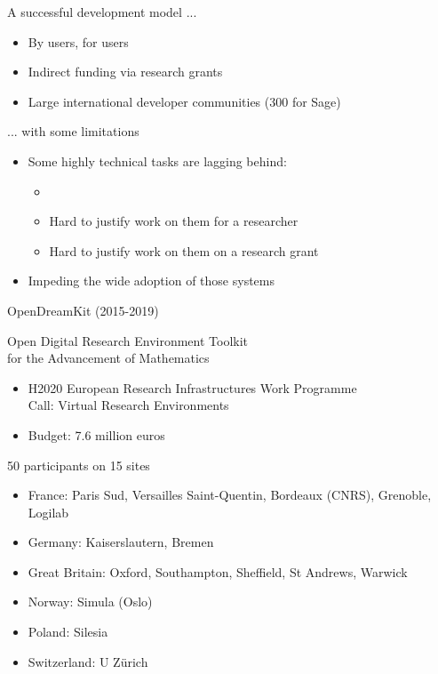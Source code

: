 \documentclass[
  usenames,svgnames, %
  compress,
  ]{beamer}
\begin{document}
\begin{frame}
  \begin{block}{A successful development model ...}
    \begin{itemize}
    \item By users, for users
    \item Indirect funding via research grants
    \item Large international developer communities (300 for Sage)
    \end{itemize}
  \end{block}

  \begin{block}{... with some limitations}
    \begin{itemize}
    \item Some highly technical tasks are lagging behind:
      \begin{itemize}
      \item \item Hard to justify work on them for a researcher
      \item Hard to justify work on them on a research grant
      \end{itemize}
    \item Impeding the wide adoption of those systems
    \end{itemize}
  \end{block}
\end{frame}

\begin{frame}{OpenDreamKit (2015-2019)}
  \begin{block}{Open Digital Research Environment Toolkit\\
    for the Advancement of Mathematics}
    \begin{itemize}
    \item H2020 European Research Infrastructures Work
      Programme\\
 Call: Virtual Research Environments
    \item Budget: 7.6 million euros
    \end{itemize}
  \end{block}

\begin{block}{50 participants on 15 sites}
    \begin{itemize}
    \item France: Paris Sud, Versailles Saint-Quentin, Bordeaux
      (CNRS), Grenoble, Logilab
    \item Germany: Kaiserslautern, Bremen
    \item Great Britain: Oxford, Southampton, Sheffield, St Andrews, Warwick
    \item Norway: Simula (Oslo)
    \item Poland: Silesia
    \item Switzerland: U Zürich
    \end{itemize}
  \end{block}
\end{frame}
\end{document}
